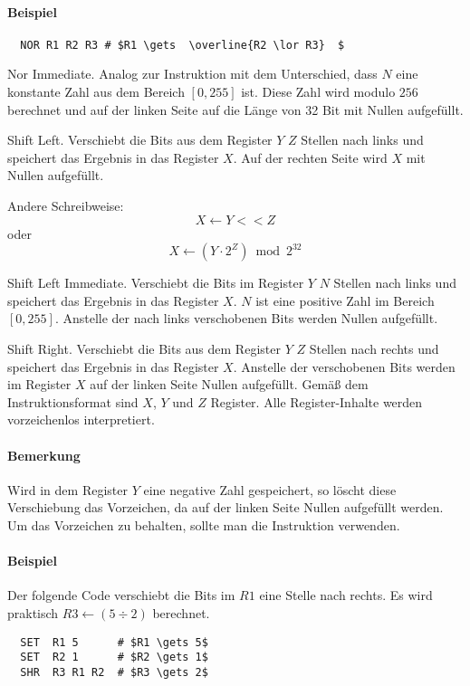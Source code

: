 \paragraph{Beispiel}
\begin{lstlisting}
  NOR R1 R2 R3 # $R1 \gets  \overline{R2 \lor R3}  $
\end{lstlisting}


\glqq Nor Immediate\grqq.
Analog zur Instruktion  mit dem Unterschied, dass $N$ eine konstante
Zahl aus dem Bereich $[0, 255]$ ist. Diese Zahl wird modulo $256$ berechnet und
auf der linken Seite auf die Länge von 32 Bit mit Nullen aufgefüllt.



\glqq Shift Left\grqq.
Verschiebt die Bits aus dem Register $Y$ $Z$ Stellen nach links und speichert
das Ergebnis in das Register $X$.
Auf der rechten Seite wird $X$ mit Nullen aufgefüllt.

Andere Schreibweise:
\[
    X \gets Y << Z
\]
oder 
\[
    X \gets 
    ( Y \cdot 2^{Z}  ) \bmod 2^{32}
\]



\glqq Shift Left Immediate\grqq.
Verschiebt die Bits im Register $Y$ $N$ Stellen nach links und speichert das
Ergebnis in das Register $X$.
$N$ ist eine positive Zahl im Bereich $[0, 255]$.
Anstelle der nach links verschobenen Bits werden Nullen aufgefüllt.



\glqq Shift Right\grqq.
Verschiebt die Bits aus dem Register $Y$ $Z$ Stellen nach rechts und speichert
das Ergebnis in das Register $X$. 
Anstelle der verschobenen Bits werden im Register $X$ auf der linken Seite
Nullen aufgefüllt.
Gemäß dem Instruktionsformat  sind $X$, $Y$ und $Z$ Register.
Alle Register-Inhalte werden vorzeichenlos interpretiert.

\paragraph{Bemerkung}
Wird in dem Register $Y$ eine negative Zahl gespeichert, so löscht diese
Verschiebung das Vorzeichen, da auf der linken Seite Nullen aufgefüllt werden.
Um das Vorzeichen zu behalten, sollte man die Instruktion 
verwenden.

\paragraph{Beispiel}
Der folgende Code verschiebt die Bits im $R1$ eine Stelle nach rechts.
Es wird praktisch $R3 \gets (5 \div 2)$ berechnet.
\begin{lstlisting}
  SET  R1 5      # $R1 \gets 5$
  SET  R2 1      # $R2 \gets 1$
  SHR  R3 R1 R2  # $R3 \gets 2$
\end{lstlisting}


